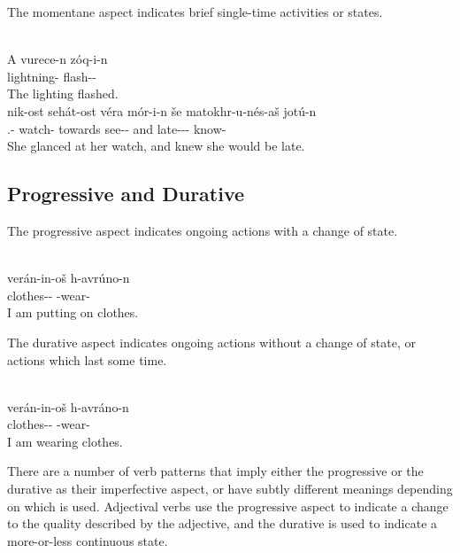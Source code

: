 \documentclass[grammar]{subfiles}
\begin{document}
The momentane aspect indicates brief single-time activities or states.   

\begin{exe}
  \ex {}\\
  \gll A vurece-n zóq-i-n\\
  {\Def} lightning-{\Dir} flash-{\Momt}-{\AgtT}\\
  \glt The lighting flashed. %
  \ex {}\\
  \gll nik-ost sehát-ost véra mór-i-n še matokhr-u-nés-aš jotú-n\\ 
  {\Tsg}.{\Gen}-{\Loc} watch-{\Loc} towards see-{\Momt}-{\AgtT} and late-{\Perf}-{\Subj}-{\PatT} know\bs{\Perf}-{\AgtT}\\
  \glt She glanced at her watch, and knew she would be late.
\end{exe}


\subsection{Progressive and Durative}
\label{vp:ssec_progressive_durative}

The progressive aspect indicates ongoing actions with a change of state.  

\begin{exe}
  \ex\label{ex:vm:putting_on_clothes} \\
  \gll verán-in-oš h-avrúno-n\\
  clothes-{\Part}-{\Acc} {\Fsg}-wear\bs{\Prog}-{\AgtT}\\
  \glt I am putting on clothes.
\end{exe}

The durative aspect indicates ongoing actions without a change of state, or
actions which last some time.

\begin{exe}
  \ex\label{ex:vm:wearing_clothes} \\
  \gll verán-in-oš h-avráno-n\\
  clothes-{\Part}-{\Acc} {\Fsg}-wear\bs{\Dur}-{\AgtT}\\
  \glt I am wearing clothes.
\end{exe}

There are a number of verb patterns that imply either the progressive or the
durative as their imperfective aspect, or have subtly different meanings
depending on which is used.  Adjectival verbs use the progressive aspect to
indicate a change to the quality described by the adjective, and the durative
is used to indicate a more-or-less continuous state. 
\end{document}
